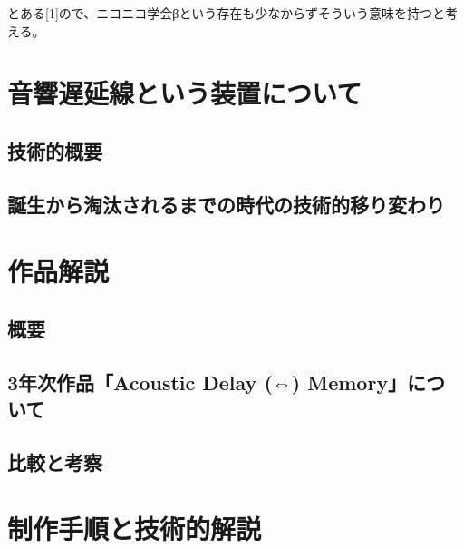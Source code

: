 とある{[}1{]}ので、ニコニコ学会βという存在も少なからずそういう意味を持つと考える。\\

\section{}\label{section}

\chapter{音響遅延線という装置について}\label{ux97f3ux97ffux9045ux5ef6ux7ddaux3068ux3044ux3046ux88c5ux7f6eux306bux3064ux3044ux3066}

\section{技術的概要}\label{ux6280ux8853ux7684ux6982ux8981}

\section{誕生から淘汰されるまでの時代の技術的移り変わり}\label{ux8a95ux751fux304bux3089ux6dd8ux6c70ux3055ux308cux308bux307eux3067ux306eux6642ux4ee3ux306eux6280ux8853ux7684ux79fbux308aux5909ux308fux308a}

\chapter{作品解説}\label{ux4f5cux54c1ux89e3ux8aac}

\section{概要}\label{ux6982ux8981}

\section{3年次作品「Acoustic Delay (⇔)
Memory」について}\label{ux5e74ux6b21ux4f5cux54c1acoustic-delay-memoryux306bux3064ux3044ux3066}

\section{比較と考察}\label{ux6bd4ux8f03ux3068ux8003ux5bdf}

\chapter{制作手順と技術的解説}\label{ux5236ux4f5cux624bux9806ux3068ux6280ux8853ux7684ux89e3ux8aac}

